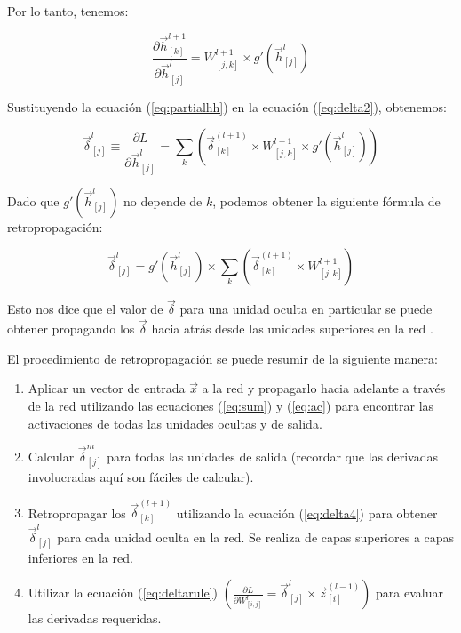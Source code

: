 Por lo tanto, tenemos:

\begin{equation}
\frac{\partial \vec{h}_{[k]}^{l+1}}{\partial \vec{h}_{[j]}^l} =  W_{[j,k]}^{l+1} \times g'(\vec{h}_{[j]}^{l})
\label{eq:partialhh}
\end{equation}

Sustituyendo la ecuación (\ref{eq:partialhh}) en la ecuación (\ref{eq:delta2}), obtenemos:

\begin{equation}
\vec{\delta}_{[j]}^l \equiv \frac{\partial L}{\partial \vec{h}_{[j]}^l} = \sum_{k} \left( \vec{\delta}_{[k]}^{(l+1)}  \times W_{[j,k]}^{l+1} \times g'(\vec{h}_{[j]}^{l}) \right)
\label{eq:delta3}
\end{equation}

Dado que $g'(\vec{h}_{[j]}^{l})$ no depende de $k$, podemos obtener la siguiente fórmula de retropropagación:

\begin{equation}
\vec{\delta}_{[j]}^l = g'(\vec{h}_{[j]}^{l}) \times \sum_{k} \left( \vec{\delta}_{[k]}^{(l+1)}  \times W_{[j,k]}^{l+1}\right)
\label{eq:delta4}
\end{equation}

Esto nos dice que el valor de $\vec{\delta}$ para una unidad oculta en particular se puede obtener propagando los $\vec{\delta}$ hacia atrás desde las unidades superiores en la red \cite{bishop2006pattern}.

El procedimiento de retropropagación se puede resumir de la siguiente manera:

\begin{enumerate}
  \item Aplicar un vector de entrada $\vec{x}$ a la red y propagarlo hacia adelante a través de la red utilizando las ecuaciones (\ref{eq:sum}) y (\ref{eq:ac}) para encontrar las activaciones de todas las unidades ocultas y de salida.
  \item Calcular $\vec{\delta}_{[j]}^m$ para todas las unidades de salida (recordar que las derivadas involucradas aquí son fáciles de calcular).
  \item Retropropagar los $\vec{\delta}_{[k]}^{(l+1)}$ utilizando la ecuación (\ref{eq:delta4}) para obtener $\vec{\delta}_{[j]}^l$ para cada unidad oculta en la red. Se realiza de capas superiores a capas inferiores en la red.
  \item Utilizar la ecuación (\ref{eq:deltarule}) $(\frac{\partial L}{\partial W_{[i,j]}^l} = \vec{\delta}_{[j]}^l \times \vec{z}_{[i]}^{(l-1)})$ para evaluar las derivadas requeridas.
\end{enumerate}
